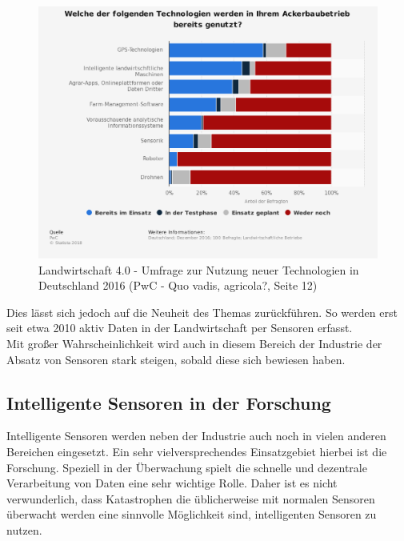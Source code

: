 \documentclass[a4paper,12pt]{scrartcl}
\begin{document}
\begin{figure}[H]
\centering
\includegraphics[scale=0.45]{picture/Landwirtschaft}
\caption{Landwirtschaft 4.0 - Umfrage zur Nutzung neuer Technologien in Deutschland 2016 (PwC - Quo vadis, agricola?, Seite 12)}
\label{fig:Landwirtschaft 4.0 - Umfrage zur Nutzung neuer Technologien in Deutschland 2016}
\end{figure}

Dies lässt sich jedoch auf die Neuheit des Themas zurückführen. So werden erst seit etwa 2010 aktiv Daten in der Landwirtschaft per Sensoren erfasst.\cite{Agricultural Management through Wireless Sensors and Internet of Things, Seite 6}\\
Mit großer Wahrscheinlichkeit wird auch in diesem Bereich der Industrie der Absatz von Sensoren stark steigen, sobald diese sich bewiesen haben.
\cite{https://www.comarch.de/news/industrie-40/industrie-40-news/nachruestung-von-maschinen-fuer-industrie-40/}

\newpage
\subsection{Intelligente Sensoren in der Forschung}
Intelligente Sensoren werden neben der Industrie auch noch in vielen anderen Bereichen eingesetzt. Ein sehr vielversprechendes Einsatzgebiet hierbei ist die Forschung. Speziell in der Überwachung spielt die schnelle und dezentrale Verarbeitung von Daten eine sehr wichtige Rolle. Daher ist es nicht verwunderlich, dass Katastrophen die üblicherweise mit normalen Sensoren überwacht werden eine sinnvolle Möglichkeit sind, intelligenten Sensoren zu nutzen. 
\end{document}
